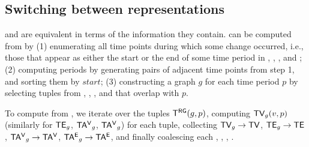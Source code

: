 \subsection{Switching between representations}  
\label{sec:model:switch}

\trg and \tve are equivalent in terms of the information they contain.
\trg can be computed from \tve by (1) enumerating all time points
during which some change occurred, i.e., those that appear as either
the start or the end of some time period in \tv, \te, \tav, and \tae;
(2) computing \trg periods by generating pairs of adjacent time points
from step 1, and sorting them by $start$; (3) constructing a graph $g$
for each time period $p$ by selecting tuples from \tv, \te, \tav, and
\tae that overlap with $p$.

To compute \tve from \trg, we iterate over the tuples $\mathsf{T^{RG}} (g,p)$,
computing $\textsf{TV}_g(v,p)$ (similarly for $\textsf{TE}_g$, $\mathsf{TA^{V}}_g$, $\mathsf{TA^{V}}_g$) for
each tuple, collecting $\textsf{TV}_g \rightarrow \textsf{TV}$, $\textsf{TE}_g \rightarrow
\textsf{TE}$, $\mathsf{TA^{V}}_g \rightarrow \mathsf{TA^{V}}$, $\mathsf{TA^{E}}_g \rightarrow \mathsf{TA^{E}}$, and
finally coalescing each \tv, \te, \tav, \tae.

  

